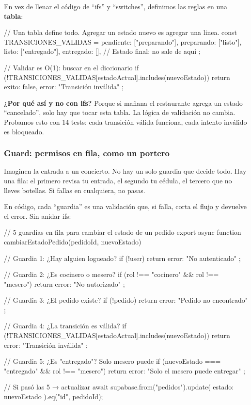 \documentclass[12pt,a4paper]{article}
\begin{document}
En vez de llenar el código de ``ifs'' y ``switches'', definimos las reglas en una \textbf{tabla}:

\begin{codeblock}
// Una tabla define todo. Agregar un estado nuevo es agregar una linea.
const TRANSICIONES_VALIDAS = {
  pendiente:  ["preparando"],
  preparando: ["listo"],
  listo:      ["entregado"],
  entregado:  [],               // Estado final: no sale de aquí
};

// Validar es O(1): buscar en el diccionario
if (!TRANSICIONES_VALIDAS[estadoActual].includes(nuevoEstado)) {
  return { exito: false, error: "Transición inválida" };
}
\end{codeblock}

\begin{tipbox}
\textbf{¿Por qué así y no con ifs?} Porque si mañana el restaurante agrega un estado ``cancelado'', solo hay que tocar esta tabla. La lógica de validación no cambia. Probamos esto con 14 tests: cada transición válida funciona, cada intento inválido es bloqueado.
\end{tipbox}

\subsubsection{Guard: permisos en fila, como un portero}

Imaginen la entrada a un concierto. No hay un solo guardia que decide todo. Hay una fila: el primero revisa tu entrada, el segundo tu cédula, el tercero que no lleves botellas. Si fallas en cualquiera, no pasas.

En código, cada ``guardia'' es una validación que, si falla, corta el flujo y devuelve el error. Sin anidar ifs:

\begin{codeblock}
// 5 guardias en fila para cambiar el estado de un pedido
export async function cambiarEstadoPedido(pedidoId, nuevoEstado) {
  // Guardia 1: ¿Hay alguien logueado?
  if (!user) return { error: "No autenticado" };

  // Guardia 2: ¿Es cocinero o mesero?
  if (rol !== "cocinero" && rol !== "mesero") return { error: "No autorizado" };

  // Guardia 3: ¿El pedido existe?
  if (!pedido) return { error: "Pedido no encontrado" };

  // Guardia 4: ¿La transición es válida?
  if (!TRANSICIONES_VALIDAS[estadoActual].includes(nuevoEstado))
    return { error: "Transición inválida" };

  // Guardia 5: ¿Es "entregado"? Solo mesero puede
  if (nuevoEstado === "entregado" && rol !== "mesero")
    return { error: "Solo el mesero puede entregar" };

  // Si pasó las 5 → actualizar
  await supabase.from("pedidos").update({ estado: nuevoEstado }).eq("id", pedidoId);
}
\end{codeblock}
\end{document}
